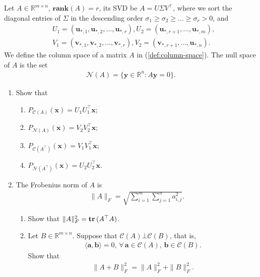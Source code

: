 \documentclass[11pt,letter,notitlepage]{article}
\DeclareMathOperator*{\tr}{\bf tr\,}
\newcommand{\rank}[1]{ \textbf{rank}  (#1)  }
\begin{document}
\begin{exercise}
    Let $A\in\mathbb{R}^{m\times n}$, $\rank{A}=r$, its SVD be $A=U\Sigma V^{\top}$, where we sort the diagonal entries of $\Sigma$ in the descending order $\sigma_1\geq\sigma_2\geq\ldots\geq\sigma_r>0$, and
    \begin{align*}
        &U_1=(\mathbf{u}_{*,1},\mathbf{u}_{*,2},\ldots,\mathbf{u}_{*,r}), U_2=(\mathbf{u}_{*,r+1},\ldots,\mathbf{u}_{*,m}),\\
        &V_1=(\mathbf{v}_{*,1},\mathbf{v}_{*,2},\ldots,\mathbf{v}_{*,r}), V_2=(\mathbf{v}_{*,r+1},\ldots,\mathbf{u}_{*,n}).
    \end{align*}
    We define the column space of a matrix $A$ in (\ref{def:column-space}).
    The null space of $A$ is the set
    \begin{align}\label{def:column-space}
        \mathcal{N}(A)=\{\mathbf{y}\in\mathbb{R}^n: A\mathbf{y}=0\}.
    \end{align}
    
    \begin{enumerate}
        \item Show that 
            \begin{enumerate}
                \item $P_{\mathcal{C}(A)}(\mathbf{x})=U_1U_1^{\top}\mathbf{x}$;
                \item $P_{\mathcal{N}(A)}(\mathbf{x})=V_2V_2^{\top}\mathbf{x}$;
                \item $P_{\mathcal{C}(A^{\top})}(\mathbf{x})=V_1V_1^{\top}\mathbf{x}$;
                \item $P_{\mathcal{N}(A^{\top})}(\mathbf{x})=U_2U_2^{\top}\mathbf{x}$.
            \end{enumerate}
            
        \item The Frobenius norm of $A$ is
            \begin{align*}
                \|A\|_F=\sqrt{\sum_{i=1}^m\sum_{j=1}^na_{i,j}^2}.
            \end{align*}
            \begin{enumerate}
                \item Show that $\|A\|_F^2=\tr(A^{\top}A)$.
                
                \item Let $B\in\mathbb{R}^{m\times n}$. Suppose that $\mathcal{C}(A)\bot\mathcal{C}(B)$, that is, 
                \begin{align*}
                    \langle\mathbf{a},\mathbf{b}\rangle=0,\,\forall\,\mathbf{a}\in\mathcal{C}(A),\,\mathbf{b}\in\mathcal{C}(B).
                \end{align*}
                Show that
                \begin{align*}
                    \|A+B\|_F^2=\|A\|_F^2+\|B\|_F^2.
                \end{align*}
            \end{enumerate}
            

\end{enumerate}
\end{exercise}
\end{document}
